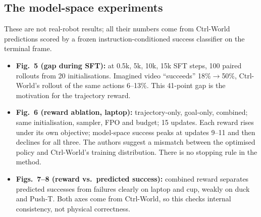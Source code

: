 \subsection{The model-space experiments}
These are not real-robot results; all their numbers come from Ctrl-World predictions scored by a frozen instruction-conditioned success classifier on the terminal frame.
\begin{itemize}
\item \textbf{Fig.~5 (gap during SFT):} at 0.5k, 5k, 10k, 15k SFT steps, 100 paired rollouts from 20 initialisations. Imagined video ``succeeds'' 18\%$\to$50\%, Ctrl-World's rollout of the same actions 6--13\%. This 41-point gap is the motivation for the trajectory reward.
\item \textbf{Fig.~6 (reward ablation, laptop):} trajectory-only, goal-only, combined; same initialisation, sampler, FPO and budget; 15 updates. Each reward rises under its own objective; model-space success peaks at updates 9--11 and then declines for all three. The authors suggest a mismatch between the optimised policy and Ctrl-World's training distribution. There is no stopping rule in the method.
\item \textbf{Figs.~7--8 (reward vs.\ predicted success):} combined reward separates predicted successes from failures clearly on laptop and cup, weakly on duck and Push-T. Both axes come from Ctrl-World, so this checks internal consistency, not physical correctness.
\end{itemize}

